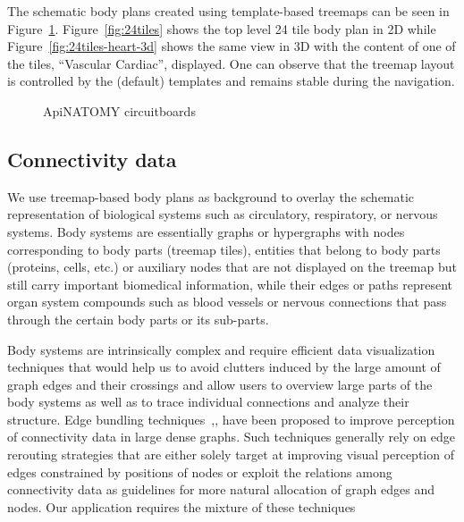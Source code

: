 The schematic body plans created using template-based treemaps can be seen in Figure~\ref{fig:treemaps}. Figure~\ref{fig:24tiles} shows the top level 24 tile body plan in 2D while Figure~\ref{fig:24tiles-heart-3d} shows the same view in 3D with the content of one of the tiles, ``Vascular Cardiac'', displayed. One can observe that the treemap layout is controlled by the (default) templates and remains stable during the navigation.

\begin{figure}
\centering
  \caption{ApiNATOMY circuitboards}
  \label{fig:treemaps}
\end{figure}

\subsection{Connectivity data}

We use treemap-based body plans as background to overlay the schematic representation of biological systems such as
circulatory, respiratory, or nervous systems. Body systems are essentially graphs or hypergraphs with nodes corresponding to body parts (treemap tiles), entities that belong to body parts (proteins, cells, etc.) or auxiliary nodes that are not displayed on the treemap but still carry important biomedical information, while their edges or paths represent organ system compounds such as blood vessels or nervous connections that pass through the certain body parts or its sub-parts.

Body systems are intrinsically complex and require efficient data visualization techniques that would help us to avoid clutters induced by the large amount of graph edges and their crossings and allow users to overview large parts of the body systems as well as to trace individual connections and analyze their structure. Edge bundling techniques~\cite{Hol06},\cite{GHN+11},\cite{HET12} have been proposed to improve perception of connectivity data in large dense graphs.
Such techniques generally rely on edge rerouting strategies that are either solely target at improving visual perception of edges constrained by positions of nodes or exploit the relations among connectivity data as guidelines for more natural allocation of graph edges and nodes. Our application requires the mixture of these techniques

